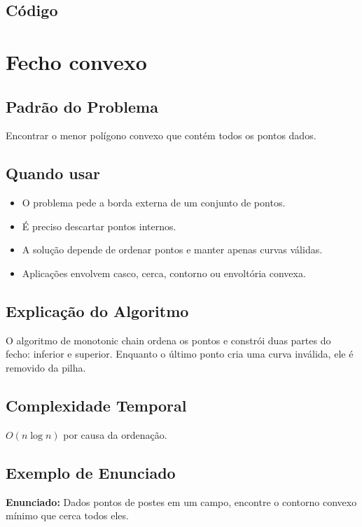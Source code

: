 \subsection{Código}

\section{Fecho convexo}

\subsection{Padrão do Problema}
Encontrar o menor polígono convexo que contém todos os pontos dados.

\subsection{Quando usar}
\begin{itemize}[nosep]
  \item O problema pede a borda externa de um conjunto de pontos.
  \item É preciso descartar pontos internos.
  \item A solução depende de ordenar pontos e manter apenas curvas válidas.
  \item Aplicações envolvem casco, cerca, contorno ou envoltória convexa.
\end{itemize}

\subsection{Explicação do Algoritmo}
O algoritmo de monotonic chain ordena os pontos e constrói duas partes do fecho: inferior e superior. Enquanto o último ponto cria uma curva inválida, ele é removido da pilha.

\subsection{Complexidade Temporal}
$O(n \log n)$ por causa da ordenação.

\subsection{Exemplo de Enunciado}
\begin{exemplodiabox}
\textbf{Enunciado:} Dados pontos de postes em um campo, encontre o contorno convexo mínimo que cerca todos eles.
\end{exemplodiabox}

